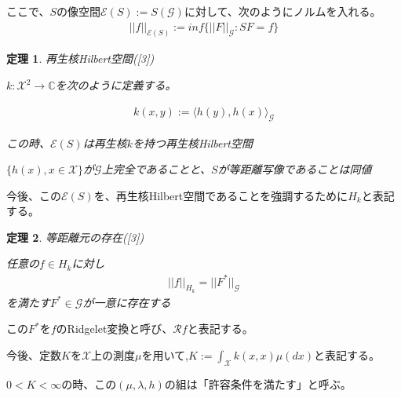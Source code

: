\documentclass{jsarticle}
\newtheorem{theo}{定理}[section]
\begin{document}
ここで、$S$の像空間$\mathcal{E}(S):=S(\mathcal{G})$に対して、次のようにノルムを入れる。
\begin{align}
||f||_{\mathcal{E}(S)}:=inf\{||F||_\mathcal{G}:SF=f\}
\end{align}


\begin{theo} 再生核Hilbert空間([3])

$k:\mathcal{X}^2\to\mathbb{C}$を次のように定義する。

\begin{align}
k(x,y):=\langle h(y),h(x)\rangle_\mathcal{G}
\end{align}

この時、$\mathcal{E}(S)$は再生核$k$を持つ再生核Hilbert空間

$\{h(x),x\in\mathcal{X}\}$が$\mathcal{G}$上完全であることと、$S$が等距離写像であることは同値

\end{theo}

今後、この$\mathcal{E}(S)$を、再生核Hilbert空間であることを強調するために$H_k$と表記する。

\begin{theo} 等距離元の存在([3])

任意の$f\in H_k$に対し
\begin{align}
||f||_{H_k}=||F^*||_\mathcal{G}
\end{align}
を満たす$F^*\in\mathcal{G}$が一意に存在する
\end{theo}

この$F^*$を$f$のRidgelet変換と呼び、$\mathcal{R}f$と表記する。

今後、定数$K$を$\mathcal{X}$上の測度$\mu$を用いて,$K:=\int_\mathcal{X}k(x,x)\mu(dx)$と表記する。

$0<K<\infty$の時、この$(\mu,\lambda,h)$の組は「許容条件を満たす」と呼ぶ。
\end{document}
